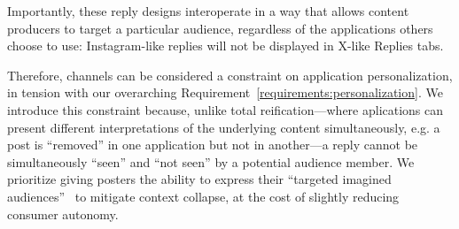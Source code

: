Importantly, these reply designs interoperate in a way that allows content producers to target a particular audience,
regardless of the applications others choose to use:
Instagram-like replies will not be displayed in X-like Replies tabs.

Therefore, channels can be considered a constraint on application personalization,
in tension with our overarching Requirement~\ref{requirements:personalization}.
We introduce this constraint because, unlike total reification---where aplications
can present different interpretations of the underlying
content simultaneously, e.g. a post is ``removed'' in one application but not in another---a reply
cannot be simultaneously ``seen'' and ``not seen'' by a potential audience member.
We prioritize giving posters the ability to express their ``targeted imagined audiences''~\cite{imaginedaudience}
to mitigate context collapse, at the cost of slightly reducing consumer autonomy.








